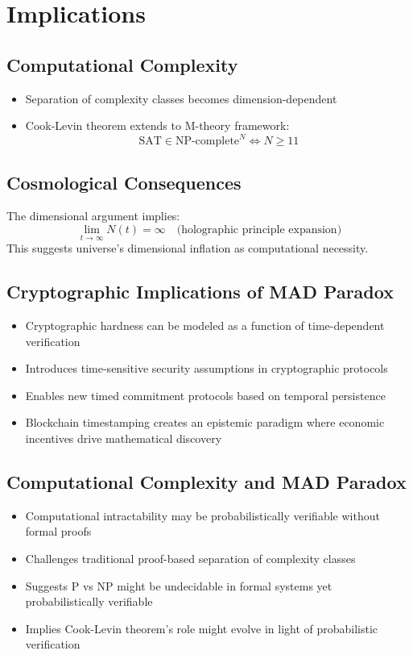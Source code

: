 \documentclass{article}
\begin{document}
\section{Implications}
\subsection{Computational Complexity}
\begin{itemize}
    \item Separation of complexity classes becomes dimension-dependent
    \item Cook-Levin theorem extends to M-theory framework:
\[
\text{SAT} \in \text{NP-complete}^{N} \iff N \geq 11
\]
\end{itemize}

\subsection{Cosmological Consequences}
The dimensional argument implies:
\[
\lim_{t \to \infty} N(t) = \infty \quad \text{(holographic principle expansion)}
\]
This suggests universe's dimensional inflation as computational necessity.

\subsection{Cryptographic Implications of MAD Paradox}
\begin{itemize}
    \item Cryptographic hardness can be modeled as a function of time-dependent verification
    \item Introduces time-sensitive security assumptions in cryptographic protocols
    \item Enables new timed commitment protocols based on temporal persistence
    \item Blockchain timestamping creates an epistemic paradigm where economic incentives drive mathematical discovery
\end{itemize}

\subsection{Computational Complexity and MAD Paradox}
\begin{itemize}
    \item Computational intractability may be probabilistically verifiable without formal proofs
    \item Challenges traditional proof-based separation of complexity classes
    \item Suggests P vs NP might be undecidable in formal systems yet probabilistically verifiable
    \item Implies Cook-Levin theorem's role might evolve in light of probabilistic verification
\end{itemize}
\end{document}
